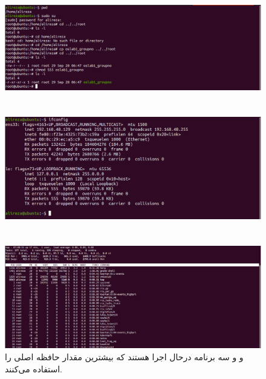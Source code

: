 \documentclass{article}
\begin{document}
\subsection{}
\begin{figure}[ht]
    \centering
    \includegraphics[width=1.0\textwidth]{figures/1.4.png}
    \caption{}
    \label{fig:fig1}
\end{figure}
\FloatBarrier

\section{}
\begin{figure}[ht]
    \centering
    \includegraphics[width=1.0\textwidth]{figures/2.png}
    \caption{}
    \label{fig:fig1}
\end{figure}
\FloatBarrier


\section{}
\begin{figure}[ht]
    \centering
    \includegraphics[width=1.0\textwidth]{figures/3.png}
    \caption
	{
و
و
سه برنامه درحال اجرا هستند که بیشترین مقدار حافظه اصلی را استفاده می‌کنند.
	}
    \label{fig:fig1}
\end{figure}
\FloatBarrier
\end{document}
